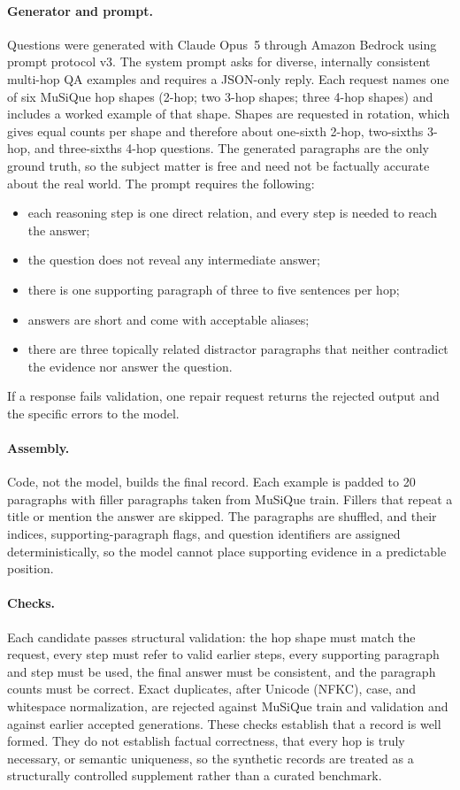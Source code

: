 \paragraph{Generator and prompt.} Questions were generated with Claude Opus~5
through Amazon Bedrock using prompt protocol v3. The system prompt asks for
diverse, internally consistent multi-hop QA examples and requires a JSON-only
reply. Each request names one of six MuSiQue hop shapes (2-hop; two 3-hop
shapes; three 4-hop shapes) and includes a worked example of that shape. Shapes
are requested in rotation, which gives equal counts per shape and therefore
about one-sixth 2-hop, two-sixths 3-hop, and three-sixths 4-hop questions. The
generated paragraphs are the only ground truth, so the subject matter is free
and need not be factually accurate about the real world. The prompt requires
the following:
\begin{itemize}[nosep]
    \item each reasoning step is one direct relation, and every step is needed
    to reach the answer;
    \item the question does not reveal any intermediate answer;
    \item there is one supporting paragraph of three to five sentences per hop;
    \item answers are short and come with acceptable aliases;
    \item there are three topically related distractor paragraphs that neither
    contradict the evidence nor answer the question.
\end{itemize}
If a response fails validation, one repair request returns the rejected output
and the specific errors to the model.

\paragraph{Assembly.} Code, not the model, builds the final record. Each
example is padded to 20 paragraphs with filler paragraphs taken from MuSiQue
train. Fillers that repeat a title or mention the answer are skipped. The
paragraphs are shuffled, and their indices, supporting-paragraph flags, and
question identifiers are assigned deterministically, so the model cannot place
supporting evidence in a predictable position.

\paragraph{Checks.} Each candidate passes structural validation: the hop shape
must match the request, every step must refer to valid earlier steps, every
supporting paragraph and step must be used, the final answer must be
consistent, and the paragraph counts must be correct. Exact duplicates, after
Unicode (NFKC), case, and whitespace normalization, are rejected against
MuSiQue train and validation and against earlier accepted generations. These
checks establish that a record is well formed. They do not establish factual
correctness, that every hop is truly necessary, or semantic uniqueness, so the
synthetic records are treated as a structurally controlled supplement rather
than a curated benchmark.

